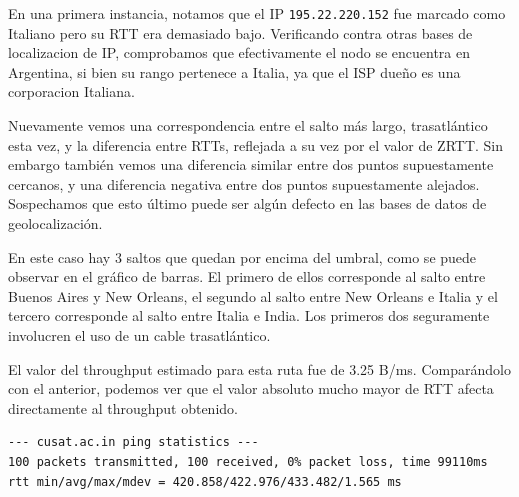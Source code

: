\vspace{20pt}

En una primera instancia, notamos que el IP \verb|195.22.220.152| fue marcado como Italiano pero su RTT era demasiado bajo. Verificando contra otras bases de localizacion de IP, comprobamos que efectivamente el nodo se encuentra en Argentina, si bien su rango pertenece a Italia, ya que el ISP dueño es una corporacion Italiana.

Nuevamente vemos una correspondencia entre el salto más largo, trasatlántico esta vez, y la diferencia entre RTTs, reflejada a su vez por el valor de ZRTT. Sin embargo también vemos una diferencia similar entre dos puntos supuestamente cercanos, y una diferencia negativa entre dos puntos supuestamente alejados. Sospechamos que esto último puede ser algún defecto en las bases de datos de geolocalización.

En este caso hay 3 saltos que quedan por encima del umbral, como se puede observar en el gráfico de barras. El primero de ellos corresponde al salto entre Buenos Aires y New Orleans, el segundo al salto entre New Orleans e Italia y el tercero corresponde al salto entre Italia e India. Los primeros dos seguramente involucren el uso de un cable trasatlántico.

El valor del throughput estimado para esta ruta fue de 3.25 B/ms. Comparándolo con el anterior, podemos ver que el valor absoluto mucho mayor de RTT afecta directamente al throughput obtenido.

\begin{verbatim}
--- cusat.ac.in ping statistics ---
100 packets transmitted, 100 received, 0% packet loss, time 99110ms
rtt min/avg/max/mdev = 420.858/422.976/433.482/1.565 ms
\end{verbatim}


